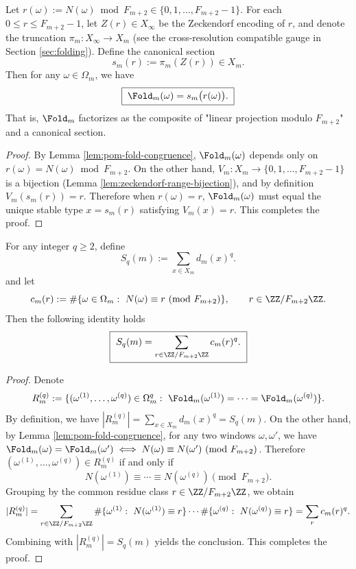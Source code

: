 \begin{proposition}\label{prop:pom-fold-as-section}
Let \(r(\omega):=N(\omega)\bmod F_{m+2}\in\{0,1,\dots,F_{m+2}-1\}\).
For each \(0\le r\le F_{m+2}-1\), let \(Z(r)\in X_\infty\) be the Zeckendorf encoding of \(r\), and denote the truncation \(\pi_m: X_\infty\to X_m\) (see the cross-resolution compatible gauge in Section \ref{sec:folding}). Define the canonical section
\[
s_m(r):=\pi_m(Z(r))\in X_m.
\]
Then for any \(\omega\in\Omega_m\), we have
\[
\boxed{\;\Fold_m(\omega)=s_m\bigl(r(\omega)\bigr).\;}
\]
That is, \(\Fold_m\) factorizes as the composite of "linear projection modulo \(F_{m+2}\)" and a canonical section.
\end{proposition}
\begin{proof}
By Lemma \ref{lem:pom-fold-congruence}, \(\Fold_m(\omega)\) depends only on \(r(\omega)=N(\omega)\bmod F_{m+2}\).
On the other hand, \(V_m:X_m\to\{0,1,\dots,F_{m+2}-1\}\) is a bijection (Lemma \ref{lem:zeckendorf-range-bijection}), and by definition \(V_m(s_m(r))=r\).
Therefore when \(r(\omega)=r\), \(\Fold_m(\omega)\) must equal the unique stable type \(x=s_m(r)\) satisfying \(V_m(x)=r\). This completes the proof.
\end{proof}

\begin{proposition}\label{prop:pom-moment-congruence-q}
For any integer \(q\ge 2\), define
$$
S_q(m):=\sum_{x\in X_m} d_m(x)^q.
$$
and let
$$
c_m(r):=\#\{\omega\in\Omega_m:\ N(\omega)\equiv r\ (\mathrm{mod}\ F_{m+2})\},\qquad r\in\ZZ/F_{m+2}\ZZ.
$$
Then the following identity holds
$$
\boxed{\
S_q(m)=\sum_{r\in\ZZ/F_{m+2}\ZZ} c_m(r)^q.
\ }
$$
\end{proposition}
\begin{proof}
Denote
$$
R_m^{(q)}:=\{(\omega^{(1)},\dots,\omega^{(q)})\in\Omega_m^q:\ \Fold_m(\omega^{(1)})=\cdots=\Fold_m(\omega^{(q)})\}.
$$
By definition, we have \(|R_m^{(q)}|=\sum_{x\in X_m}d_m(x)^q=S_q(m)\).
On the other hand, by Lemma \ref{lem:pom-fold-congruence}, for any two windows \(\omega,\omega'\), we have
\(
\Fold_m(\omega)=\Fold_m(\omega')\iff N(\omega)\equiv N(\omega')\ (\mathrm{mod}\ F_{m+2})
\).
Therefore \((\omega^{(1)},\dots,\omega^{(q)})\in R_m^{(q)}\) if and only if
$$
N(\omega^{(1)})\equiv \cdots \equiv N(\omega^{(q)})\pmod{F_{m+2}}.
$$
Grouping by the common residue class \(r\in\ZZ/F_{m+2}\ZZ\), we obtain
$$
|R_m^{(q)}|
=\sum_{r\in\ZZ/F_{m+2}\ZZ}\#\{\omega^{(1)}:\ N(\omega^{(1)})\equiv r\}\cdots \#\{\omega^{(q)}:\ N(\omega^{(q)})\equiv r\}
=\sum_{r}c_m(r)^q.
$$
Combining with \(|R_m^{(q)}|=S_q(m)\) yields the conclusion. This completes the proof.
\end{proof}

